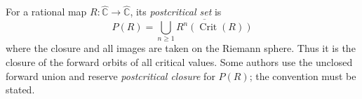 
For a rational map $R:\widehat{\mathbb C}\to\widehat{\mathbb C}$, its \emph{postcritical set} is
\[
P(R)=\overline{\bigcup_{n\ge1}R^n(\operatorname{Crit}(R))}
\]
where the closure and all images are taken on the Riemann sphere. Thus it is the closure of the forward orbits of all critical values. Some authors use the unclosed forward union and reserve \emph{postcritical closure} for $P(R)$; the convention must be stated.
